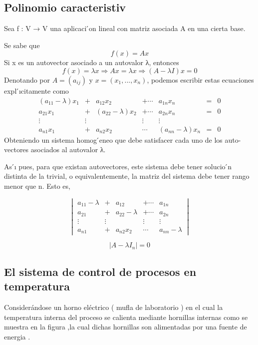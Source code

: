 \documentclass[Spanish,12pt,doublespace,german,letterpaper,dvipdfm]{article}
\begin{document}
\subsection{Polinomio caracteristiv}
Sea f : V → V una aplicaci ́on lineal con matriz asociada A en una cierta base.


Se sabe que 
$$f(x) = Ax$$ 
Si x es un autovector asociado a un autovalor λ, entonces
$$f(x) = λx ⇒ Ax = λx ⇒ (A − λI)x = 0$$
Denotando por $A = (a_{ij})$ y $x = (x_1,...,x_n)$, podemos escribir estas ecuaciones expl ́ıcitamente como
\begin{equation}
\begin{matrix}
 (a_{11}-\lambda)x_1    & + & a_{12}x_2          & +\cdots & a_{1n}x_n       & =  & 0\\
  a_{21}x_1             & + & (a_{22}-\lambda)x_2  & +\cdots & a_{2n}x_n       & =  & 0\\
 \vdots & \vdots        &        & \vdots & \vdots \\
  a_{n1}x_1             & + & a_{n2}x_2   & \cdots & (a_{nn}-\lambda)x_n &  =  & 0
\end{matrix}
\end{equation}
Obteniendo un sistema homog ́eneo que debe satisfacer cada uno de los auto- vectores asociados al autovalor λ.

As ́ı pues, para que existan autovectores, este sistema debe tener solucio ́n distinta de la trivial, o equivalentemente, la matriz del sistema debe tener rango menor que n. 
Esto es,

\begin{equation}
\begin{vmatrix}
  a_{11}-\lambda    & + & a_{12}          & +\cdots & a_{1n}       \\
  a_{21}            & + & a_{22}-\lambda  & +\cdots & a_{2n}       \\
 \vdots & \vdots        &        & \vdots & \vdots \\
  a_{n1}             & + & a_{n2}x_2   & \cdots & a_{nn}-\lambda 
\end{vmatrix}
\end{equation}

$$|A -\lambda I_n|=0$$
\subsection{El sistema de control de procesos en temperatura}
Considerándose un horno el\'ectrico ( mufla de laboratorio ) en el
cual la temperatura interna del proceso se calienta mediante
hornillas  internas como se muestra en la figura ,la cual dichas
hornillas son alimentadas por una
fuente de energia .\\
\end{document}
